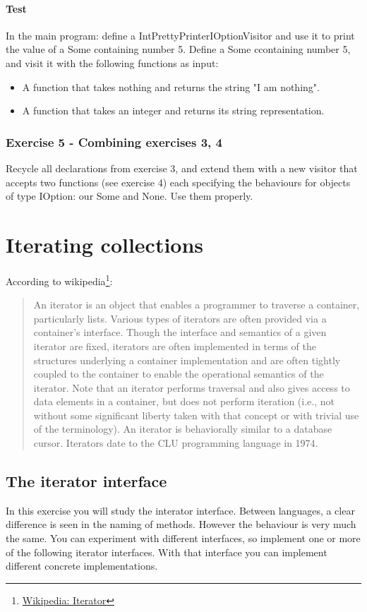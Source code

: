 \subsubsection{Test}
In the main program: define a IntPrettyPrinterIOptionVisitor and use it to print the value of a Some containing number 5.
Define a Some ccontaining number 5, and visit it with the following functions as input:
\begin{itemize}
    \item A function that takes nothing and returns the string "I am nothing".
    \item A function that takes an integer and returns its string representation.
\end{itemize}

\subsection{Exercise 5 - Combining exercises 3, 4}
Recycle all declarations from exercise 3, and extend them with a new visitor that accepts two functions (see exercise 4) each specifying the behaviours for objects of type IOption: our Some and None. Use them properly.


\chapter{Iterating collections}
According to wikipedia\footnote{\href{https://en.wikipedia.org/wiki/Iterator}{Wikipedia: Iterator}}:
\blockquote{
An iterator is an object that enables a programmer to traverse a container, particularly lists.
Various types of iterators are often provided via a container's interface.
Though the interface and semantics of a given iterator are fixed, iterators are often implemented in terms of the structures underlying a container implementation and are often tightly coupled to the container to enable the operational semantics of the iterator.
Note that an iterator performs traversal and also gives access to data elements in a container, but does not perform iteration (i.e., not without some significant liberty taken with that concept or with trivial use of the terminology).
An iterator is behaviorally similar to a database cursor.
Iterators date to the CLU programming language in 1974.
}

\section{The iterator interface}
In this exercise you will study the interator interface.
Between languages, a clear difference is seen in the naming of methods.
However the behaviour is very much the same.
You can experiment with different interfaces, so implement one or more of the following iterator interfaces.
With that interface you can implement different concrete implementations.

